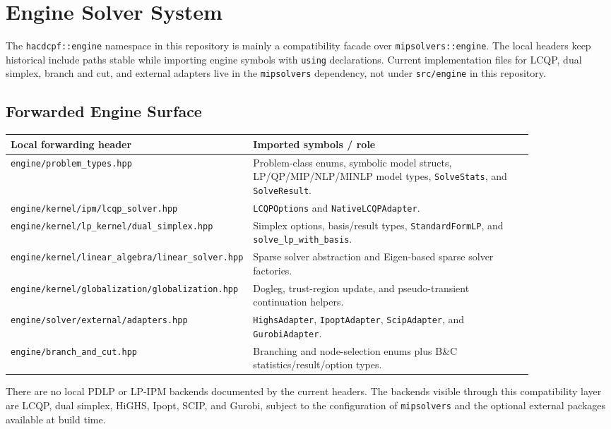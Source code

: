 \section{Engine Solver System}
\label{sec:engine-solver-system}

The \texttt{hacdcpf::engine} namespace in this repository is mainly a
compatibility facade over \texttt{mipsolvers::engine}.  The local headers keep
historical include paths stable while importing engine symbols with \texttt{using}
declarations.  Current implementation files for LCQP, dual simplex, branch and
cut, and external adapters live in the \texttt{mipsolvers} dependency, not under
\texttt{src/engine} in this repository.

\subsection{Forwarded Engine Surface}

\begin{longtable}{L{0.30\linewidth}L{0.56\linewidth}}
\toprule
Local forwarding header & Imported symbols / role \\
\midrule
\endhead
\texttt{engine/problem\_types.hpp} & Problem-class enums, symbolic model structs, LP/QP/MIP/NLP/MINLP model types, \texttt{SolveStats}, and \texttt{SolveResult}. \\
\texttt{engine/kernel/ipm/lcqp\_solver.hpp} & \texttt{LCQPOptions} and \texttt{NativeLCQPAdapter}. \\
\texttt{engine/kernel/lp\_kernel/dual\_simplex.hpp} & Simplex options, basis/result types, \texttt{StandardFormLP}, and \texttt{solve\_lp\_with\_basis}. \\
\texttt{engine/kernel/linear\_algebra/linear\_solver.hpp} & Sparse solver abstraction and Eigen-based sparse solver factories. \\
\texttt{engine/kernel/globalization/globalization.hpp} & Dogleg, trust-region update, and pseudo-transient continuation helpers. \\
\texttt{engine/solver/external/adapters.hpp} & \texttt{HighsAdapter}, \texttt{IpoptAdapter}, \texttt{ScipAdapter}, and \texttt{GurobiAdapter}. \\
\texttt{engine/branch\_and\_cut.hpp} & Branching and node-selection enums plus B\&C statistics/result/option types. \\
\bottomrule
\end{longtable}

There are no local PDLP or LP-IPM backends documented by the current headers.
The backends visible through this compatibility layer are LCQP, dual simplex,
HiGHS, Ipopt, SCIP, and Gurobi, subject to the configuration of
\texttt{mipsolvers} and the optional external packages available at build time.

